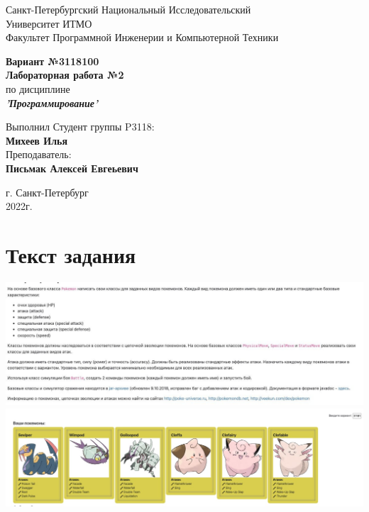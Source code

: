 \documentclass[12pt,onecolumn]{article}
\begin{document}
\begin{center}
    Санкт-Петербургский Национальный Исследовательский\\ 
    Университет ИТМО\\
    Факультет Программной Инженерии и Компьютерной Техники\\
\end{center}
\vspace{1cm}


\begin{center}
    \large \textbf{Вариант №3118100}\\
    \textbf{Лабораторная работа №2}\\
    по дисциплине\\
    \textbf{\textit{'Программирование'}}
\end{center}

\vspace{3cm}
\begin{flushright}
  Выполнил Студент  группы P3118: \\
  \textbf{Михеев Илья}\\
  Преподаватель: \\
  \textbf{Письмак Алексей Евгеьевич}\\
\end{flushright}

\vspace{14cm}
\begin{center}
    г. Санкт-Петербург\\
    2022г.
\end{center}

\newpage

\tableofcontents

\vspace{1cm}

\section{Текст задания}
\includegraphics[width=\columnwidth]{imgs/lab2task.png}
\includegraphics[width=\columnwidth]{imgs/lab2pokes.png}
\end{document}
